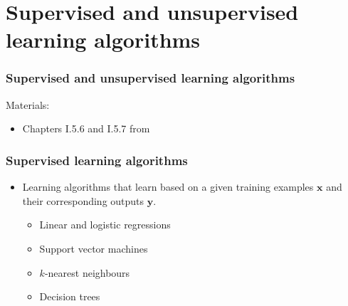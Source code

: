 \documentclass[notes]{beamer}          %
\newcommand{\vect}[1]{\bm{#1}}
\newif\iffull
\begin{document}
\iffull
\begin{frame}
\frametitle{Properties of maximum likelihood}
    \begin{itemize}
        \item It can be shown that the maximum likelihood estimator is the best asymptotically, i.e. as $m \rightarrow \infty$, in terms of its convergence rate.
        \item {\bf Property of consistency}: as the number of training examples approaches infinity the maximum likelihood estimate of a parameter converges towards the true parameter value.
        \item The maximum likelihood estimator has the property of consistency provided:
            \begin{itemize}
                \item The true distribution $p_{\mbox{data}}$ is in the model family
                $p_{\mbox{model}}(\cdot; \vect{\theta})$ %
                \item $p_{\mbox{data}}$ corresponds to exactly one value of $\vect{\theta}$ \\
            \end{itemize}
    \end{itemize}
\end{frame}
\fi

\section{Supervised and unsupervised learning algorithms}

\begin{frame}
\frametitle{Supervised and unsupervised learning algorithms}
Materials:
\begin{itemize}
    \item Chapters I.5.6 and I.5.7 from \cite{deeplearning}
\end{itemize}
\end{frame}

\begin{frame}
\frametitle{Supervised learning algorithms}
    \begin{itemize}
        \item Learning algorithms that learn based on a given training examples $\vect{x}$ and their corresponding outputs $\vect{y}$.
        \begin{itemize}
            \item Linear and logistic regressions
            \item Support vector machines
            \item $k$-nearest neighbours
            \item Decision trees
        \end{itemize}
    \end{itemize}
\end{frame}
\end{document}
